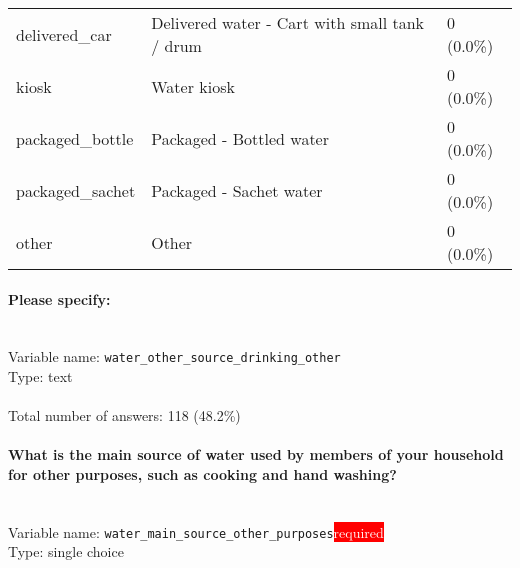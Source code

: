 \documentclass[11.5pt, a4paper]{scrartcl}
\begin{document}
\begin{tabular}{p{4cm}|p{8cm}|p{3cm}}
\cellcolor{mygray} delivered\_car & \cellcolor{mygray}Delivered water - Cart with small tank / drum & \cellcolor{color0}0 (0.0\%)\\
kiosk & Water kiosk& \cellcolor{color0}0 (0.0\%)\\
\cellcolor{mygray} packaged\_bottle & \cellcolor{mygray}Packaged - Bottled water & \cellcolor{color0}0 (0.0\%)\\
packaged\_sachet & Packaged - Sachet water & \cellcolor{color0}0 (0.0\%)\\
\cellcolor{mygray} other & \cellcolor{mygray}Other  & \cellcolor{color0}0 (0.0\%)\\
\end{tabular}
\paragraph{Please specify:}
\  \\Variable name: \texttt{water\_other\_source\_drinking\_other}\\
Type: text\\
\\Total number of answers: 118 (48.2\%)
\\[0.2em]\paragraph{What is the main source of water used by members of your household for other purposes, such as cooking and hand washing? }
\  \\Variable name: \texttt{water\_main\_source\_other\_purposes}\hfill\colorbox{red}{\small{\textcolor{white}{required}}}\\
 Type: single choice\\
\end{document}
